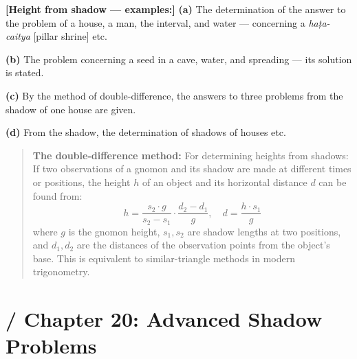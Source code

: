 \documentclass[10pt,a4paper]{article}
\newenvironment{engcommentary}
  {\begin{quote}\small\color{sectioncolor}}
  {\end{quote}}
\begin{document}
\begin{minipage}[t]{0.47\textwidth}
\end{minipage}%
\hfill\vline\hfill%
\begin{minipage}[t]{0.47\textwidth}
\textbf{[Height from shadow --- examples:]}
\textbf{(a)} The determination of the answer to the problem of a house, a man,
the interval, and water --- concerning a \textit{haṭa-caitya} [pillar shrine] etc.

\textbf{(b)} The problem concerning a seed in a cave, water, and spreading ---
its solution is stated.

\textbf{(c)} By the method of double-difference, the answers to three problems
from the shadow of one house are given.

\textbf{(d)} From the shadow, the determination of shadows of houses etc.
\end{minipage}

\vspace{1.5em}

\begin{engcommentary}
\textbf{The double-difference method:} For determining heights from shadows:
If two observations of a gnomon and its shadow are made at different times or positions,
the height $h$ of an object and its horizontal distance $d$ can be found from:
\[h = \frac{s_2 \cdot g}{s_2 - s_1} \cdot \frac{d_2 - d_1}{g}, \quad d = \frac{h \cdot s_1}{g}\]
where $g$ is the gnomon height, $s_1, s_2$ are shadow lengths at two positions,
and $d_1, d_2$ are the distances of the observation points from the object's base.
This is equivalent to similar-triangle methods in modern trigonometry.
\end{engcommentary}

\vspace{1em}
\longline

\newpage
\section*{ / Chapter 20: Advanced Shadow Problems}
\end{document}
